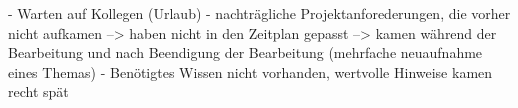 - Warten auf Kollegen (Urlaub)
- nachträgliche Projektanforederungen, die vorher nicht aufkamen
--> haben nicht in den Zeitplan gepasst
--> kamen während der Bearbeitung und nach Beendigung der Bearbeitung (mehrfache neuaufnahme eines Themas)
- Benötigtes Wissen nicht vorhanden, wertvolle Hinweise kamen recht spät

